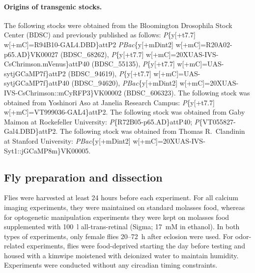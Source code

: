 \paragraph{Origins of transgenic stocks.}

{\raggedright
The following stocks were obtained from the Bloomington Drosophila Stock Center (BDSC) and previously published as follows: \textit{P}\{y[+t7.7] w[+mC]=R94B10-GAL4.DBD\}attP2 \textit{PBac}\{y[+mDint2] w[+mC]=R20A02-p65.AD\}VK00027 (BDSC\_68262), \textit{P}\{y[+t7.7] w[+mC]=20XUAS-IVS-CsChrimson.mVenus\}attP40 (BDSC\_55135), \textit{P}\{y[+t7.7] w[+mC]=UAS-sytjGCaMP7f\}attP2 (BDSC\_94619), \textit{P}\{y[+t7.7] w[+mC]=UAS-sytjGCaMP7f\}attP40 (BDSC\_94620), \textit{PBac}\{y[+mDint2] w[+mC]=20XUAS-IVS-CsChrimson::mCyRFP3\}VK00002 (BDSC\_606323).
The following stock was obtained from Yoshinori Aso at Janelia Research Campus: \textit{P}\{y[+t7.7] w[+mC]=VT999036-GAL4\}attP2.
The following stock was obtained from Gaby Maimon at Rockefeller University: \textit{P}\{R72B05-p65.AD\}attP40; \textit{P}\{VT055827-Gal4.DBD\}attP2.
The following stock was obtained from Thomas R.\ Clandinin at Stanford University: \textit{PBac}\{y[+mDint2] w[+mC]=20XUAS-IVS-Syt1::jGCaMP8m\}VK00005.

}

\subsection{Fly preparation and dissection}

Flies were harvested at least 24 hours before each experiment. For all calcium imaging experiments, they were maintained on standard molasses food, whereas for optogenetic manipulation experiments they were kept on molasses food supplemented with 100~\textmu l all-trans-retinal (Sigma; 17~mM in ethanol). In both types of experiments, only female flies 20--72~h after eclosion were used. For odor-related experiments, flies were food-deprived starting the day before testing and housed with a kimwipe moistened with deionized water to maintain humidity. Experiments were conducted without any circadian timing constraints.

